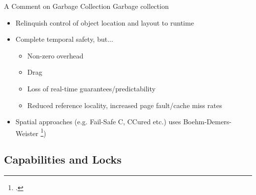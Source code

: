 \documentclass[aspectratio=169]{beamer}
\begin{document}
\begin{frame}{A Comment on Garbage Collection}
Garbage collection
    \begin{itemize}[<+->]
        \item Relinquish control of object location and layout to runtime 
        \item Complete temporal safety, but...
        \begin{itemize}
            \item Non-zero overhead
            \item Drag
            \item Loss of real-time guarantees/predictability
            \item Reduced reference locality, increased page fault/cache miss rates
        \end{itemize}
        \item Spatial approaches (e.g. Fail-Safe C, CCured etc.) uses Boehm-Demers-Weister \footcite{boehm_garbage_1988})
    \end{itemize}
\end{frame}

\subsection{Capabilities and Locks}
\end{document}
